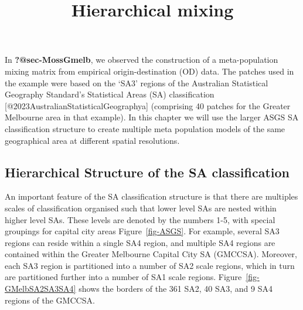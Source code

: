 \documentclass[
  letterpaper,
  DIV=11,
  numbers=noendperiod]{scrartcl}
\title{Hierarchical mixing}
\author{}
\date{}
\begin{document}
\maketitle
\ifdefined\Shaded\renewenvironment{Shaded}{\begin{tcolorbox}[enhanced, interior hidden, borderline west={3pt}{0pt}{shadecolor}, frame hidden, breakable, boxrule=0pt, sharp corners]}{\end{tcolorbox}}\fi

In \textbf{?@sec-MossGmelb}, we observed the construction of a
meta-population mixing matrix from empirical origin-destination (OD)
data. The patches used in the example were based on the `SA3' regions of
the Australian Statistical Geography Standard's Statistical Areas (SA)
classification {[}@2023AustralianStatisticalGeographya{]} (comprising 40
patches for the Greater Melbourne area in that example). In this chapter
we will use the larger ASGS SA classification structure to create
multiple meta population models of the same geographical area at
different spatial resolutions.

\hypertarget{hierarchical-structure-of-the-sa-classification}{%
\subsection{Hierarchical Structure of the SA
classification}\label{hierarchical-structure-of-the-sa-classification}}

An important feature of the SA classification structure is that there
are multiples scales of classification organised such that lower level
SAs are nested within higher level SAs. These levels are denoted by the
numbers 1-5, with special groupings for capital city areas
Figure~\ref{fig-ASGS}. For example, several SA3 regions can reside
within a single SA4 region, and multiple SA4 regions are contained
within the Greater Melbourne Capital City SA (GMCCSA). Moreover, each
SA3 region is partitioned into a number of SA2 scale regions, which in
turn are partitioned further into a number of SA1 scale regions.
Figure~\ref{fig-GMelbSA2SA3SA4} shows the borders of the 361 SA2, 40
SA3, and 9 SA4 regions of the GMCCSA.
\end{document}
